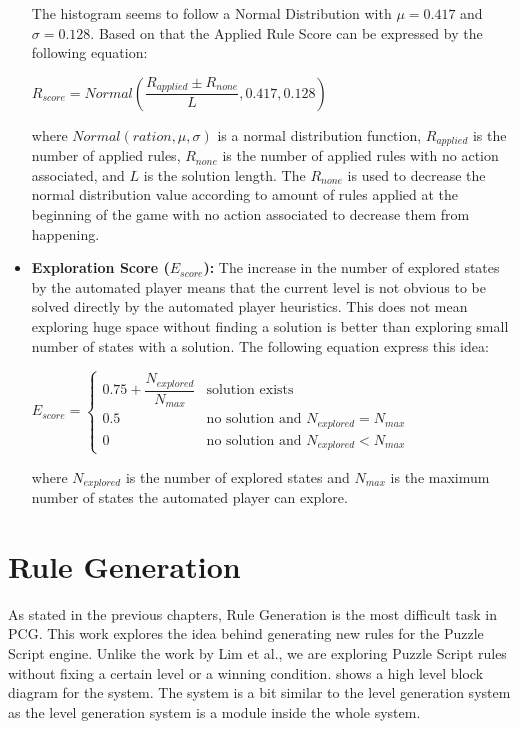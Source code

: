 \begin{itemize}
	
	The histogram seems to follow a Normal Distribution with $\mu = 0.417$ and $\sigma = 0.128$. Based on that the Applied Rule Score can be expressed by the following equation:
	\begin{center}$R_{score} = Normal(\dfrac{R_{applied} \pm R_{none}}{L}, 0.417, 0.128)$\end{center}
	where $Normal(ration, \mu, \sigma)$ is a normal distribution function, $R_{applied}$ is the number of applied rules, $R_{none}$ is the number of applied rules with no action associated, and $L$ is the solution length. The $R_{none}$ is used to decrease the normal distribution value according to amount of rules applied at the beginning of the game with no action associated to decrease them from happening.
	
	\item \textbf{Exploration Score ($E_{score}$):} The increase in the number of explored states by the automated player means that the current level is not obvious to be solved directly by the automated player heuristics. This does not mean exploring huge space without finding a solution is better than exploring small number of states with a solution. The following equation express this idea:
	\begin{center}
	$E_{score}= \begin{cases}
	               0.75 + \dfrac{N_{explored}}{N_{max}} & \text{solution exists}\\
	               0.5 & \text{no solution and }N_{explored} = N_{max}\\
	               0 & \text{no solution and }N_{explored} < N_{max}
	           \end{cases}$
	\end{center}
	where $N_{explored}$ is the number of explored states and $N_{max}$ is the maximum number of states the automated player can explore.
\end{itemize}

\section{Rule Generation}
As stated in the previous chapters, Rule Generation is the most difficult task in PCG. This work explores the idea behind generating new rules for the Puzzle Script engine. Unlike the work by Lim et al.\cite{puzzleScriptGeneration}, we are exploring Puzzle Script rules without fixing a certain level or a winning condition.  shows a high level block diagram for the system. The system is a bit similar to the level generation system as the level generation system is a module inside the whole system.

